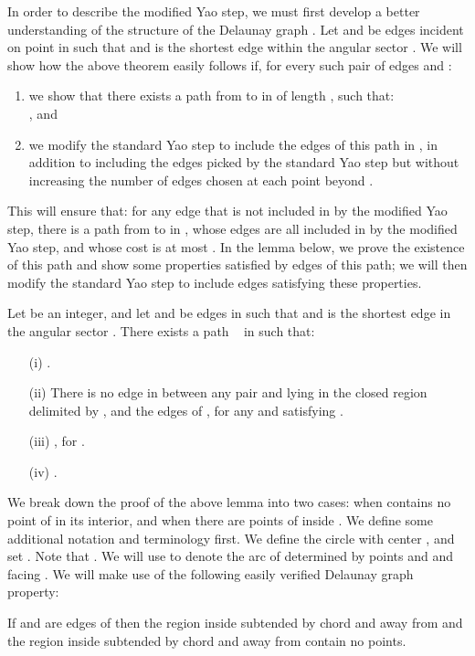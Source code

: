 \documentclass{stacs_proc}
\theoremstyle{plain}\newtheorem{satz}[thm]{Satz}
\begin{document}
In order to describe the modified Yao step, we must first develop a
better understanding of the structure of the Delaunay graph . Let
 and  be edges incident on point  in  such that
 and  is the shortest edge within the
angular sector . We will show how the above theorem easily
follows if, for every such pair of edges  and :
\begin{enumerate}

\item we show that there exists a path  from  to  in  of length ,
such that:\\    , and

\item we modify the standard Yao step to include the edges of this
path in , in addition to including the edges picked by the
standard Yao step but without increasing the number of edges chosen at each
point beyond .
\end{enumerate}
This will ensure that: for any edge  that is not included in 
by the modified Yao step, there is a path from  to  in , whose
edges are all included in  by the modified Yao step, and whose cost is
at most . In the lemma below, we prove
the existence of this path and show some properties satisfied by edges of this
path; we will then modify the standard Yao step to include edges satisfying
these properties.
\begin{lemma}
\label{canpath} Let  be an integer, and let  and 
be edges in  such that  and  is the
shortest edge in the angular sector . There exists a
path ~ in  such that:

\begin{itemize}
\item[(i)] .
\item[(ii)] There is no edge in  between any pair  and  lying in the closed region delimited by
,  and the edges of , for any  and 
satisfying .
\item[(iii)] , for .
\item[(iv)] .
\end{itemize}
\end{lemma}
We break down the proof of the above lemma into two cases: when
 contains no point of  in its interior, and when there
 are points of  inside . We define some additional notation
and terminology first. We define the circle  with center
, and set . Note that . We will use  to denote the arc of 
determined by points  and  and facing . We will make use
of the following easily verified Delaunay graph property:
\begin{proposition}
\label{Euclidproperty} If  and  are edges of  then the region inside 
subtended by chord  and away from  and the region inside  subtended
by chord  and away from  contain no points.
\end{proposition}
\end{document}
